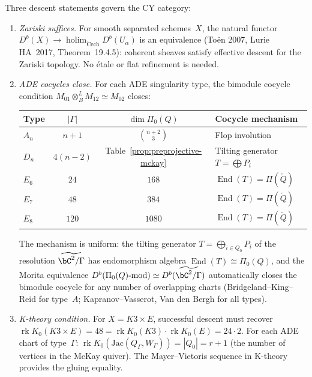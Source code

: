 \begin{remark}
\label{rem:descent-sufficiency}
Three descent statements govern the CY category:
\begin{enumerate}[label=\textup{(\roman*)}]
\item \emph{Zariski suffices.} For smooth separated schemes~$X$,
 the natural functor
 $D^b(X) \to \operatorname{holim}_{\mathrm{\check{C}ech}}
 D^b(U_\alpha)$ is an equivalence
 (To\"en 2007, Lurie HA~2017, Theorem~19.4.5):
 coherent sheaves satisfy effective descent for the Zariski
 topology. No \'etale or flat refinement is needed.
\item \emph{ADE cocycles close.} For each ADE singularity type,
 the bimodule cocycle condition
 $M_{01} \otimes^L_B M_{12} \simeq M_{02}$ closes:
 \begin{center}
 \small
 \renewcommand{\arraystretch}{1.2}
 \begin{tabular}{lccl}
 Type & $|\Gamma|$ & $\dim\Pi_0(Q)$ & Cocycle mechanism \\
 \hline
 $A_n$ & $n{+}1$ & $\binom{n{+}2}{3}$ & Flop involution \\
 $D_n$ & $4(n{-}2)$ & Table~\ref{prop:preprojective-mckay}
 & Tilting generator $T = \bigoplus P_i$ \\
 $E_6$ & $24$ & $168$ & $\operatorname{End}(T) = \Pi(\check{Q})$ \\
 $E_7$ & $48$ & $384$ & $\operatorname{End}(T) = \Pi(\check{Q})$ \\
 $E_8$ & $120$ & $1080$ & $\operatorname{End}(T) = \Pi(\check{Q})$
 \end{tabular}
 \end{center}
 The mechanism is uniform: the tilting generator
 $T = \bigoplus_{i \in Q_0} P_i$ of the resolution
 $\widetilde{\bC^2/\Gamma}$ has endomorphism algebra
 $\operatorname{End}(T) \cong \Pi_0(Q)$, and the Morita
 equivalence $D^b(\Pi_0(Q)\text{-mod}) \simeq
 D^b(\widetilde{\bC^2/\Gamma})$ automatically closes the
 bimodule cocycle for any number of overlapping charts
 (Bridgeland--King--Reid for type~$A$;
 Kapranov--Vasserot, Van den Bergh for all types).
 \item \emph{K-theory condition.} For $X = K3 \times E$,
 successful descent must recover
 $\operatorname{rk} K_0(K3 \times E) = 48 =
 \operatorname{rk} K_0(K3) \cdot \operatorname{rk} K_0(E)
 = 24 \cdot 2$. For each ADE chart of type~$\Gamma$:
 $\operatorname{rk} K_0(\mathrm{Jac}(Q_\Gamma, W_\Gamma))
 = |Q_0| = r + 1$ (the number of vertices in the McKay
 quiver). The Mayer--Vietoris sequence in K-theory
 provides the gluing equality.
\end{enumerate}
\end{remark}

